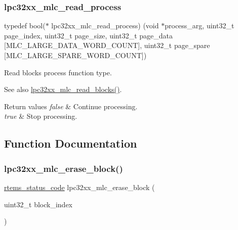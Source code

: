 \subsubsection{\texorpdfstring{lpc32xx\_mlc\_read\_process}{lpc32xx\_mlc\_read\_process}}
{\footnotesize\ttfamily typedef bool($\ast$ lpc32xx\+\_\+mlc\+\_\+read\+\_\+process) (void $\ast$process\+\_\+arg, uint32\+\_\+t page\+\_\+index, uint32\+\_\+t page\+\_\+size, uint32\+\_\+t page\+\_\+data \mbox{[}M\+L\+C\+\_\+\+L\+A\+R\+G\+E\+\_\+\+D\+A\+T\+A\+\_\+\+W\+O\+R\+D\+\_\+\+C\+O\+U\+NT\mbox{]}, uint32\+\_\+t page\+\_\+spare \mbox{[}M\+L\+C\+\_\+\+L\+A\+R\+G\+E\+\_\+\+S\+P\+A\+R\+E\+\_\+\+W\+O\+R\+D\+\_\+\+C\+O\+U\+NT\mbox{]})}



Read blocks process function type. 

\begin{DoxySeeAlso}{See also}
\mbox{\hyperlink{group__lpc32xx__nand__mlc_ga2d5f41c8abd5910ad853e7ba096c9f7b}{lpc32xx\+\_\+mlc\+\_\+read\+\_\+blocks()}}.
\end{DoxySeeAlso}

\begin{DoxyRetVals}{Return values}
{\em false} & Continue processing. \\
\hline
{\em true} & Stop processing. \\
\hline
\end{DoxyRetVals}


\subsection{Function Documentation}
\mbox{\label{group__lpc32xx__nand__mlc_ga602a6e700d0e763ba5ca98874b92f926}} 
\subsubsection{\texorpdfstring{lpc32xx\_mlc\_erase\_block()}{lpc32xx\_mlc\_erase\_block()}}
{\footnotesize\ttfamily \mbox{\hyperlink{group__ClassicStatus_ga545d41846817eaba6143d52ee4d9e9fe}{rtems\+\_\+status\+\_\+code}} lpc32xx\+\_\+mlc\+\_\+erase\+\_\+block (\begin{DoxyParamCaption}\item[{uint32\+\_\+t}]{block\+\_\+index }\end{DoxyParamCaption})}



